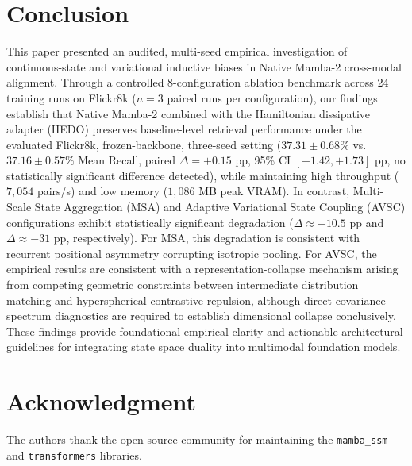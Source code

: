 \documentclass[conference]{IEEEtran}
\begin{document}
\section{Conclusion}
\label{sec:conclusion}
This paper presented an audited, multi-seed empirical investigation of continuous-state and variational inductive biases in Native Mamba-2 cross-modal alignment. Through a controlled 8-configuration ablation benchmark across 24 training runs on Flickr8k ($n=3$ paired runs per configuration), our findings establish that Native Mamba-2 combined with the Hamiltonian dissipative adapter (HEDO) preserves baseline-level retrieval performance under the evaluated Flickr8k, frozen-backbone, three-seed setting ($37.31 \pm 0.68\%$ vs. $37.16 \pm 0.57\%$ Mean Recall, paired $\Delta = +0.15$ pp, 95\% CI $[-1.42, +1.73]$ pp, no statistically significant difference detected), while maintaining high throughput ($7,054$ pairs/s) and low memory ($1,086$ MB peak VRAM). In contrast, Multi-Scale State Aggregation (MSA) and Adaptive Variational State Coupling (AVSC) configurations exhibit statistically significant degradation ($\Delta \approx -10.5$ pp and $\Delta \approx -31$ pp, respectively). For MSA, this degradation is consistent with recurrent positional asymmetry corrupting isotropic pooling. For AVSC, the empirical results are consistent with a representation-collapse mechanism arising from competing geometric constraints between intermediate distribution matching and hyperspherical contrastive repulsion, although direct covariance-spectrum diagnostics are required to establish dimensional collapse conclusively. These findings provide foundational empirical clarity and actionable architectural guidelines for integrating state space duality into multimodal foundation models.

\section*{Acknowledgment}
The authors thank the open-source community for maintaining the \texttt{mamba\_ssm} and \texttt{transformers} libraries.



\end{document}
